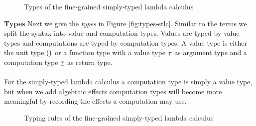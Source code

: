 {\begin{figure}
\caption{Types of the fine-grained simply-typed lambda calculus}
\centering
{}
\end{figure}

\textbf{Types}
Next we give the \emph{types} in Figure \ref{fig:types-stlc}.
Similar to the terms we split the syntax into value and computation types.
Values are typed by value types and computations are typed by computation types.
A value type is either the unit type $()$ or a function type with a value type $\tau$ as argument type and a computation type  $\underline{\tau}$ as return type.
\\\\
For the simply-typed lambda calculus a computation type is simply a value type, but when we add algebraic effects computation types will become more meaningful by recording the effects a computation may use.

\begin{figure}
\caption{Typing rules of the fine-grained simply-typed lambda calculus}
\centering
{}
\end{figure}}
